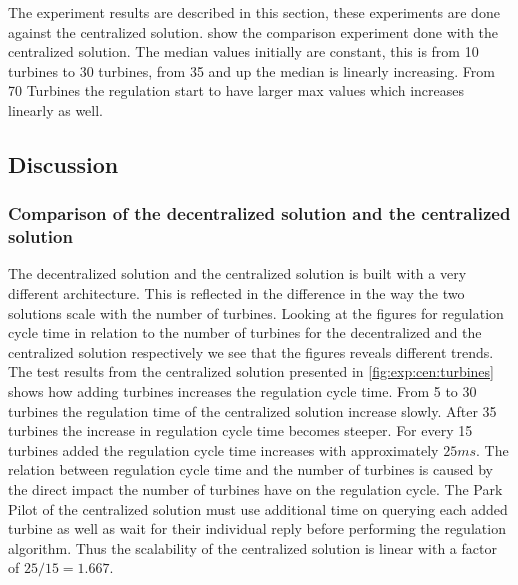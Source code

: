 The  experiment results are described in this section, these experiments are done against the centralized solution.  show the comparison experiment done with the centralized solution. The median values initially are constant, this is from 10 turbines to 30 turbines, from 35 and up the median is linearly increasing.
From 70 Turbines the regulation start to have larger max values which increases linearly as well.





\subsection{Discussion}
\subsubsection{Comparison of the decentralized solution and the centralized solution}
\label{sec:comp:decentralizedVScentralized}
The decentralized solution and the centralized solution is built with a very different architecture. This is reflected in the difference in the way the two solutions scale with the number of turbines. Looking at the figures for regulation cycle time in relation to the number of turbines for the decentralized and the centralized solution respectively we see that the figures reveals different trends. The test results from the centralized solution presented in \cref{fig:exp:cen:turbines} shows how adding turbines increases the regulation cycle time. From 5 to 30 turbines the regulation time of the centralized solution increase slowly. After 35 turbines the increase in regulation cycle time becomes steeper. For every 15 turbines added the regulation cycle time increases with approximately $25 ms$. The relation between regulation cycle time and the number of turbines is caused by the direct impact the number of turbines have on the regulation cycle. The Park Pilot of the centralized solution must use additional time on querying each added turbine as well as wait for their individual reply before performing the regulation algorithm. Thus the scalability of the centralized solution is linear with a factor of $25 / 15 = 1.667$.

